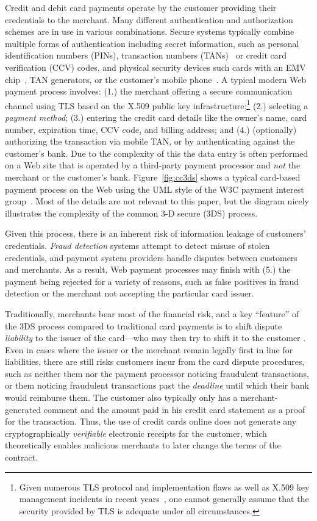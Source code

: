 \documentclass{llncs}
\begin{document}
Credit and debit card payments operate by the customer providing their
credentials to the merchant.  Many different authentication and
authorization schemes are in use in various combinations. Secure
systems typically combine multiple forms of authentication including
secret information, such as personal identification numbers (PINs),
transaction numbers (TANs)~\cite{kolbil2016tan} or credit card
verification (CCV) codes, and physical security devices such cards
with an EMV chip~\cite{emv}, TAN generators, or the customer's mobile
phone~\cite{mtan}.  A typical modern Web payment process involves:
{(1.)} the merchant offering a secure communication channel using TLS
based on the X.509 public key infrastructure;\footnote{Given numerous
  TLS protocol and implementation flaws as well as X.509 key
  management incidents in recent years~\cite{holz2014}, one cannot
  generally assume that the security provided by TLS is adequate under
  all circumstances.}  {(2.)} selecting a {\em payment method}; {(3.)}
entering the credit card details like the owner's name, card number,
expiration time, CCV code, and billing address; and {(4.)}
(optionally) authorizing the transaction via mobile TAN, or by
authenticating against the customer's bank.  Due to the complexity
of this the data entry is often performed on a Web site that
is operated by a third-party payment processor and {\em not} the merchant or
the customer's bank.  Figure~\ref{fig:cc3ds} shows a typical card-based payment
process on the Web using the UML style of the W3C payment interest
group~\cite{pigs}.  Most of the details are not relevant to this
paper, but the diagram nicely illustrates the complexity of the common
3-D secure (3DS) process.

Given this process, there is an inherent risk of information leakage
of customers' credentials.  {\em Fraud detection} systems attempt to detect
misuse of stolen credentials, and payment system providers handle
disputes between customers and merchants.  As a result, Web payment
processes may finish with {(5.)} the payment being rejected for a
variety of reasons, such as false positives in fraud detection or
the merchant not accepting the particular card issuer.

Traditionally, merchants bear most of the financial risk, and a key
``feature'' of the 3DS process compared to traditional card payments
is to shift dispute {\em liability} to the issuer of the card---who
may then try to shift it to the customer \cite[\S2.4]{3DSsucks}.
%
%
Even in cases where the issuer or the merchant remain legally first in
line for liabilities, there are still risks customers incur from the
card dispute procedures, such as neither them nor the payment
processor noticing fraudulent transactions, or them noticing
fraudulent transactions past the {\em deadline} until which their bank
would reimburse them.  The customer also typically only has a
merchant-generated comment and the amount paid in his credit card
statement as a proof for the transaction.  Thus, the use of credit
cards online does not generate any cryptographically {\em verifiable}
electronic receipts for the customer, which theoretically enables
malicious merchants to later change the terms of the contract.
\end{document}
